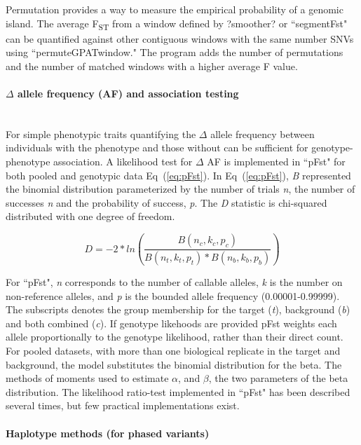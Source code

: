 \documentclass[10pt,letterpaper]{article}
\begin{document}
Permutation provides a way to measure the empirical probability of a genomic island.  The average F\textsubscript{ST} from a window defined by ?smoother? or ``segmentFst" can be quantified against other contiguous windows with the same number SNVs using ``permuteGPATwindow."  The program adds the number of permutations and the number of matched windows with a higher average F value.

\paragraph*{$\Delta$ allele frequency (AF) and association testing} \mbox{} \\

For simple phenotypic traits quantifying the $\Delta$ allele frequency between individuals with the phenotype and those without can be sufficient for genotype-phenotype association.  A likelihood test for $\Delta$ AF is implemented in ``pFst" for both pooled and genotypic data Eq~(\ref{eq:pFst}).   In Eq~(\ref{eq:pFst}), \textit{B} represented the binomial distribution parameterized by the number of trials \textit{n}, the number of successes \textit{n} and the probability of success, \textit{p}.  The \textit{D} statistic is chi-squared distributed with one degree of freedom.

\begin{equation}\label{eq:pFst} 
D=-2* ln (\frac{ B(n_c,k_c,p_c) }{ B(n_t,k_t,p_t)*B(n_b,k_b,p_b)  })
\end{equation}



For ``pFst", \textit{n} corresponds to the number of callable alleles, \textit{k} is the number on non-reference alleles, and \textit{p} is the bounded allele frequency (0.00001-0.99999).  The subscripts denotes the group membership for the target (\textit{t}), background (\textit{b}) and both combined (\textit{c}).  If genotype likehoods are provided pFst weights each allele proportionally to the genotype likelihood, rather than their direct count.   For pooled datasets, with more than one biological replicate in the target and background, the model substitutes the binomial distribution for the beta.  The methods of moments used to estimate $\alpha$, and $\beta$, the two parameters of the beta distribution.  The likelihood ratio-test implemented in ``pFst" has been described several times\cite{kim,heng}, but few practical implementations exist.  

\paragraph*{Haplotype methods (for phased variants) }\mbox{} \\
\end{document}
